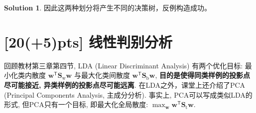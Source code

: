 \documentclass[a4paper]{article}
\numberwithin{equation}{section}
\theoremstyle{definition}
\newtheorem*{solution}{Solution}
\def \transposed {\mathsf{T}}
\def \Sw {\mathbf{S}_{\mathrm{w}}}
\def \Sb {\mathbf{S}_{\mathrm{b}}}
\def \St {\mathbf{S}_{\mathrm{t}}}
\def \w {\bm{w}}
\begin{document}
\begin{solution}
因此这两种划分将产生不同的决策树，反例构造成功。

\end{solution}

\newpage

\section{[20(+5)pts] 线性判别分析 }

回顾教材第三章第四节, LDA (Linear Discriminant Analysis) 有两个优化目标: 最小化类内散度 $\w^\transposed \Sw \w$ 与最大化类间散度 $\w^\transposed \Sb \w$, \textbf{目的是使得同类样例的投影点尽可能接近, 异类样例的投影点尽可能远离}. 在LDA之外，课堂上还介绍了PCA (Principal Components Analysis, 主成分分析). 事实上, PCA可以写成类似LDA的形式, 但PCA只有一个目标, 即最大化全局散度: $\max_{\w} \w^\transposed \St \w$.
\end{document}
